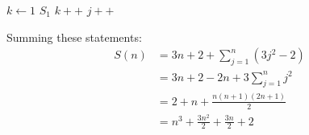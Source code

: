 \documentclass[11pt]{article}
\begin{document}
\begin{enumerate}
\begin{enumerate}
\begin{algorithmic}
 
	\State $k \gets 1$ 
	 
		\State $S_1$ 
		\State $k++$ 
	\EndWhile
	\State $j++$ 
\EndWhile
\end{algorithmic}
Summing these statements:
\begin{align*}
S(n) &= 3n+2+\sum_{j=1}^{n} (3j^2-2)
\\&= 3n+2 -2n + 3\sum_{j=1}^n j^2
\\&= 2+ n + \frac{n(n+1)(2n+1)}{2}
\\&= n^3 + \frac{3n^2}{2} + \frac{3n}{2} + 2
\end{align*}
\end{enumerate}
\end{enumerate}
\end{document}
